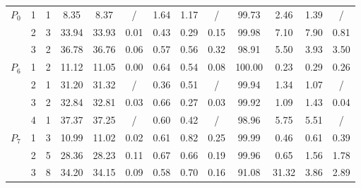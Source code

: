 \documentclass[11pt, landscape]{article}
\begin{document}
\begin{small}
\begin{table}
\begin{tabular}{ccc|c|c|c|c|c|c|c|c|c|c|}
\multicolumn{1}{|c|}{\multirow{3}{*}{$P_0$}} & \multicolumn{1}{c|}{1} 
 & 1 & 8.35 & 8.37 & / & 1.64 & 1.17 & / & 99.73 & 2.46 & 1.39 & / \\ \cline{2-13} 
\multicolumn{1}{|c|}{} & \multicolumn{1}{c|}{2} 
 & 3 & 33.94 & 33.93 & 0.01 & 0.43 & 0.29 & 0.15 & 99.98 & 7.10 & 7.90 & 0.81 \\ \cline{2-13} 
\multicolumn{1}{|c|}{} & \multicolumn{1}{c|}{3} 
 & 2 & 36.78 & 36.76 & 0.06 & 0.57 & 0.56 & 0.32 & 98.91 & 5.50 & 3.93 & 3.50 \\ \hline 

\multicolumn{1}{|c|}{\multirow{3}{*}{$P_6$}} & \multicolumn{1}{c|}{1} 
 & 2 & 11.12 & 11.05 & 0.00 & 0.64 & 0.54 & 0.08 & 100.00 & 0.23 & 0.29 & 0.26 \\ \cline{2-13} 
\multicolumn{1}{|c|}{} & \multicolumn{1}{c|}{2} 
 & 1 & 31.20 & 31.32 & / & 0.36 & 0.51 & / & 99.94 & 1.34 & 1.07 & / \\ \cline{2-13} 
\multicolumn{1}{|c|}{} & \multicolumn{1}{c|}{3} 
 & 2 & 32.84 & 32.81 & 0.03 & 0.66 & 0.27 & 0.03 & 99.92 & 1.09 & 1.43 & 0.04 \\ \cline{2-13} 
\multicolumn{1}{|c|}{} & \multicolumn{1}{c|}{4} 
 & 1 & 37.37 & 37.25 & / & 0.60 & 0.42 & / & 98.96 & 5.75 & 5.51 & / \\ \hline 

\multicolumn{1}{|c|}{\multirow{3}{*}{$P_7$}} & \multicolumn{1}{c|}{1} 
 & 3 & 10.99 & 11.02 & 0.02 & 0.61 & 0.82 & 0.25 & 99.99 & 0.46 & 0.61 & 0.39 \\ \cline{2-13} 
\multicolumn{1}{|c|}{} & \multicolumn{1}{c|}{2} 
 & 5 & 28.36 & 28.23 & 0.11 & 0.67 & 0.66 & 0.19 & 99.96 & 0.65 & 1.56 & 1.78 \\ \cline{2-13} 
\multicolumn{1}{|c|}{} & \multicolumn{1}{c|}{3} 
 & 8 & 34.20 & 34.15 & 0.09 & 0.58 & 0.70 & 0.16 & 91.08 & 31.32 & 3.86 & 2.89 \\ \hline 

\end{tabular}
\end{table}

\end{small}
\end{document}
